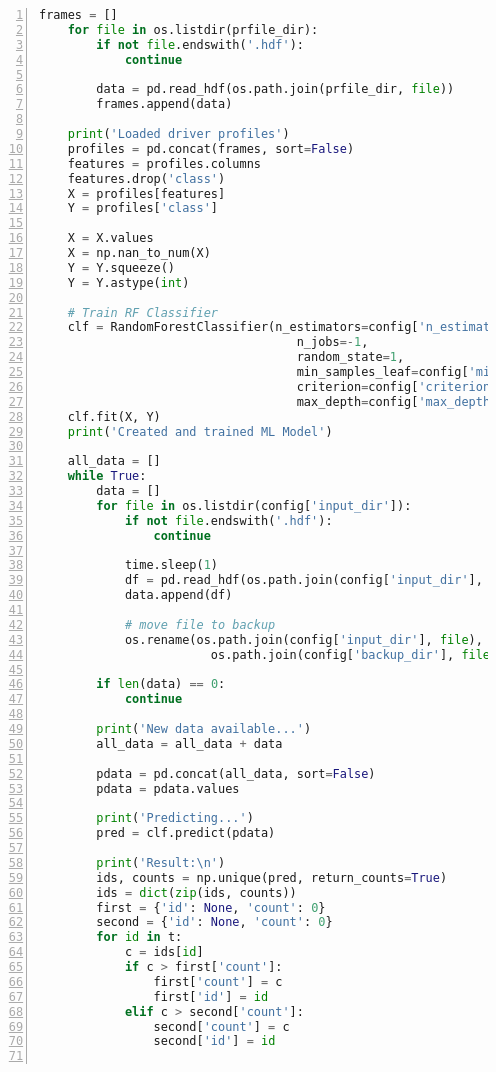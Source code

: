 \begin{lstlisting}[frame=lines, caption=Ausschnitt Fahreridentifikation, captionpos=b, label = lst:a_sw_rf, numbers=left, language=Python, showstringspaces=false, basicstyle=\footnotesize]
    frames = []
    for file in os.listdir(prfile_dir):
        if not file.endswith('.hdf'):
            continue

        data = pd.read_hdf(os.path.join(prfile_dir, file))
        frames.append(data)

    print('Loaded driver profiles')
    profiles = pd.concat(frames, sort=False)
    features = profiles.columns
    features.drop('class')
    X = profiles[features]
    Y = profiles['class']

    X = X.values
    X = np.nan_to_num(X)
    Y = Y.squeeze()
    Y = Y.astype(int)

    # Train RF Classifier
    clf = RandomForestClassifier(n_estimators=config['n_estimators'],
                                    n_jobs=-1,
                                    random_state=1,
                                    min_samples_leaf=config['min_samples_leaf'],
                                    criterion=config['criterion'],
                                    max_depth=config['max_depth'])
    clf.fit(X, Y)
    print('Created and trained ML Model')

    all_data = []
    while True:
        data = []
        for file in os.listdir(config['input_dir']):
            if not file.endswith('.hdf'):
                continue

            time.sleep(1)
            df = pd.read_hdf(os.path.join(config['input_dir'], file))
            data.append(df)

            # move file to backup
            os.rename(os.path.join(config['input_dir'], file),
                        os.path.join(config['backup_dir'], file))

        if len(data) == 0:
            continue

        print('New data available...')
        all_data = all_data + data

        pdata = pd.concat(all_data, sort=False)
        pdata = pdata.values

        print('Predicting...')
        pred = clf.predict(pdata)

        print('Result:\n')
        ids, counts = np.unique(pred, return_counts=True)
        ids = dict(zip(ids, counts))
        first = {'id': None, 'count': 0}
        second = {'id': None, 'count': 0}
        for id in t:
            c = ids[id]
            if c > first['count']:
                first['count'] = c
                first['id'] = id
            elif c > second['count']:
                second['count'] = c
                second['id'] = id


\end{lstlisting}
